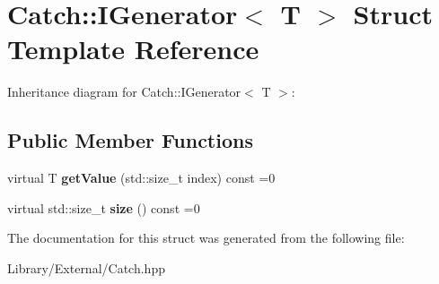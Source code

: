 \hypertarget{struct_catch_1_1_i_generator}{}\section{Catch\+:\+:I\+Generator$<$ T $>$ Struct Template Reference}
\label{struct_catch_1_1_i_generator}


Inheritance diagram for Catch\+:\+:I\+Generator$<$ T $>$\+:
\subsection*{Public Member Functions}
\begin{DoxyCompactItemize}
\item 
\hypertarget{struct_catch_1_1_i_generator_ad69e937cb66dba3ed9429c42abf4fce3}{}virtual T {\bfseries get\+Value} (std\+::size\+\_\+t index) const =0\label{struct_catch_1_1_i_generator_ad69e937cb66dba3ed9429c42abf4fce3}

\item 
\hypertarget{struct_catch_1_1_i_generator_a2e317253b03e838b6065ce69719a198e}{}virtual std\+::size\+\_\+t {\bfseries size} () const =0\label{struct_catch_1_1_i_generator_a2e317253b03e838b6065ce69719a198e}

\end{DoxyCompactItemize}


The documentation for this struct was generated from the following file\+:\begin{DoxyCompactItemize}
\item 
Library/\+External/Catch.\+hpp\end{DoxyCompactItemize}
